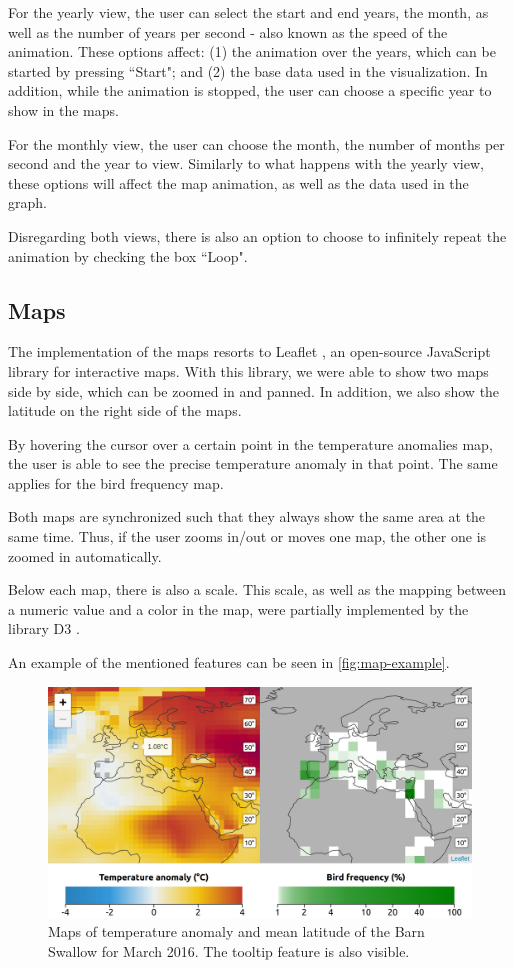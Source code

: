 \documentclass[journal]{vgtc}                %
\begin{document}
For the yearly view, the user can select the start and end years, the month, as well as the number of years per second - also known as the speed of the animation. These options affect: (1) the animation over the years, which can be started by pressing ``Start"; and (2) the base data used in the visualization. In addition, while the animation is stopped, the user can choose a specific year to show in the maps.

For the monthly view, the user can choose the month, the number of months per second and the year to view. Similarly to what happens with the yearly view, these options will affect the map animation, as well as the data used in the graph.

Disregarding both views, there is also an option to choose to infinitely repeat the animation by checking the box ``Loop".

\subsection{Maps}

The implementation of the maps resorts to Leaflet \cite{leaflet}, an open-source JavaScript library for interactive maps. With this library, we were able to show two maps side by side, which can be zoomed in and panned. In addition, we also show the latitude on the right side of the maps.

By hovering the cursor over a certain point in the temperature anomalies map, the user is able to see the precise temperature anomaly in that point. The same applies for the bird frequency map.

Both maps are synchronized such that they always show the same area at the same time. Thus, if the user zooms in/out or moves one map, the other one is zoomed in automatically.

Below each map, there is also a scale. This scale, as well as the mapping between a numeric value and a color in the map, were partially implemented by the library D3 \cite{bostock2011d3}.

An example of the mentioned features can be seen in \autoref{fig:map-example}.

\begin{figure}[t]
  \centering
  \includegraphics[width=\linewidth]{map-example}
  \caption{Maps of temperature anomaly and mean latitude of the Barn Swallow for March 2016. The tooltip feature is also visible.}
  \label{fig:map-example}
\end{figure}
\end{document}
